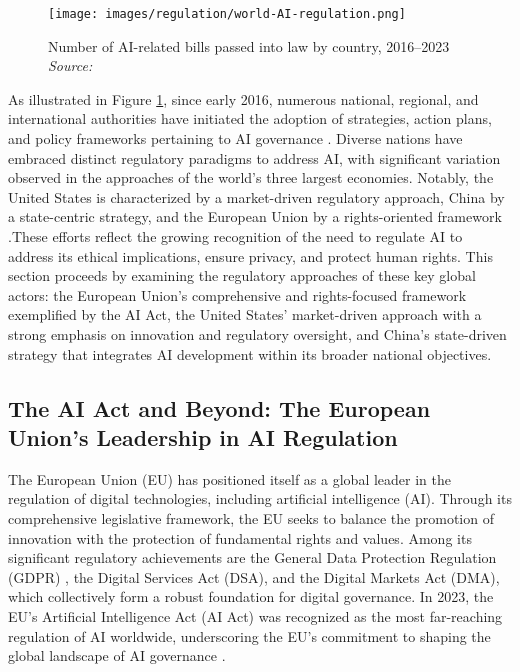 \begin{figure}[h!]
    \centering
    \texttt{[image: images/regulation/world-AI-regulation.png]}
    \caption{Number of AI-related bills passed into law by country, 2016–2023 \textit{Source:} \cite{maslej2024ai}}
    \label{fig:AI_regulations_world}
\end{figure}

As illustrated in Figure \ref{fig:AI_regulations_world}, since early 2016, numerous national, regional, and international authorities have initiated the adoption of strategies, action plans, and policy frameworks pertaining to AI governance \cite{berryhill2019hello}. Diverse nations have embraced distinct regulatory paradigms to address AI, with significant variation observed in the approaches of the world’s three largest economies. Notably, the United States is characterized by a market-driven regulatory approach, China by a state-centric strategy, and the European Union by a rights-oriented framework \cite{allen2023race}.These efforts reflect the growing recognition of the need to regulate AI to address its ethical implications, ensure privacy, and protect human rights. This section proceeds by examining the regulatory approaches of these key global actors: the European Union’s comprehensive and rights-focused framework exemplified by the AI Act, the United States’ market-driven approach with a strong emphasis on innovation and regulatory oversight, and China’s state-driven strategy that integrates AI development within its broader national objectives.

\subsection{The AI Act and Beyond: The European Union's Leadership in AI Regulation}

The European Union (EU) has positioned itself as a global leader in the regulation of digital technologies, including artificial intelligence (AI). Through its comprehensive legislative framework, the EU seeks to balance the promotion of innovation with the protection of fundamental rights and values. Among its significant regulatory achievements are the General Data Protection Regulation (GDPR) \cite{cepr_gdpr_2023}, the Digital Services Act (DSA), and the Digital Markets Act (DMA), which collectively form a robust foundation for digital governance. In 2023, the EU's Artificial Intelligence Act (AI Act) was recognized as the most far-reaching regulation of AI worldwide, underscoring the EU's commitment to shaping the global landscape of AI governance \cite{nyt_europe_ai_regulation_2023}.

